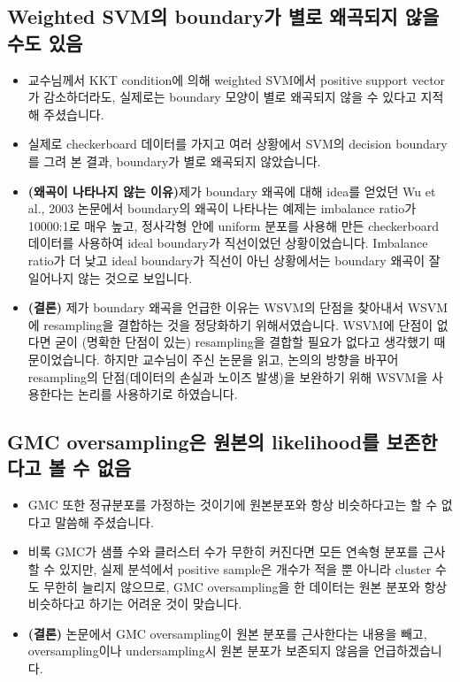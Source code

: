 \documentclass[a4papaer, 11pt]{article}
\begin{document}
\subsection{Weighted SVM의 boundary가 별로 왜곡되지 않을 수도 있음}
\begin{itemize}

\item 교수님께서 KKT condition에 의해 weighted SVM에서 positive support vector가 감소하더라도, 실제로는 boundary 모양이 별로 왜곡되지 않을 수 있다고 지적해 주셨습니다.
\item 실제로 checkerboard 데이터를 가지고 여러 상황에서 SVM의 decision boundary를 그려 본 결과, boundary가 별로 왜곡되지 않았습니다.
\item \textbf{(왜곡이 나타나지 않는 이유)}제가 boundary 왜곡에 대해 idea를 얻었던 Wu et al., 2003 논문에서 boundary의 왜곡이 나타나는 예제는 imbalance ratio가 10000:1로 매우 높고, 정사각형 안에 uniform 분포를 사용해 만든 checkerboard 데이터를 사용하여 ideal boundary가 직선이었던 상황이었습니다. Imbalance ratio가 더 낮고 ideal boundary가 직선이 아닌 상황에서는 boundary 왜곡이 잘 일어나지 않는 것으로 보입니다.
\item \textbf{(결론)} 제가 boundary 왜곡을 언급한 이유는 WSVM의 단점을 찾아내서 WSVM에  resampling을 결합하는 것을 정당화하기 위해서였습니다. WSVM에 단점이 없다면 굳이 (명확한 단점이 있는) resampling을 결합할 필요가 없다고 생각했기 때문이었습니다. 하지만 교수님이 주신 논문을 읽고, 논의의 방향을 바꾸어 resampling의 단점(데이터의 손실과 노이즈 발생)을 보완하기 위해 WSVM을 사용한다는 논리를 사용하기로 하였습니다.
\end{itemize}
\subsection{GMC oversampling은 원본의 likelihood를 보존한다고 볼 수 없음}
\begin{itemize}
	\item GMC 또한 정규분포를 가정하는 것이기에 원본분포와 항상 비슷하다고는 할 수 없다고 말씀해 주셨습니다.
	\item 비록 GMC가 샘플 수와 클러스터 수가 무한히 커진다면 모든 연속형 분포를 근사할 수 있지만, 실제 분석에서 positive sample은 개수가 적을 뿐 아니라 cluster 수도 무한히 늘리지 않으므로, GMC oversampling을 한 데이터는 원본 분포와 항상 비슷하다고 하기는 어려운 것이 맞습니다.
	\item \textbf{(결론)} 논문에서 GMC oversampling이 원본 분포를 근사한다는 내용을 빼고, oversampling이나 undersampling시 원본 분포가 보존되지 않음을 언급하겠습니다.

\end{itemize}
\end{document}
